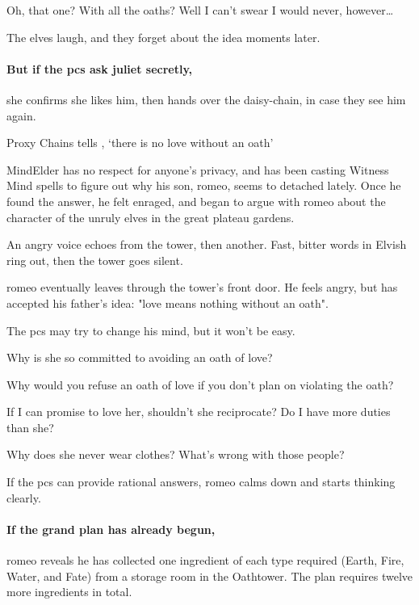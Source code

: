 \begin{speechtext}
  Oh, that one?
  With all the oaths?
  Well I can't swear I would never, however\ldots
\end{speechtext}

The elves laugh, and they forget about the idea moments later.

\paragraph{But if the \glspl{pc} ask \gls{juliet} secretly,}
she confirms she likes him, then hands over the daisy-chain, in case they see him again.

{Proxy Chains}%
{ tells , `there is no love without an oath'}%

\Gls{MindElder} has no respect for anyone's privacy, and has been casting Witness Mind spells to figure out why his son, \gls{romeo}, seems to detached lately.
Once he found the answer, he felt enraged, and began to argue with \gls{romeo} about the character of the unruly elves in the great plateau gardens.


\begin{boxtext}
  An angry voice echoes from the tower, then another.
  Fast, bitter words in Elvish ring out, then the tower goes silent.
\end{boxtext}

\Gls{romeo} eventually leaves through the tower's front door.
He feels angry, but has accepted his father's idea: "love means nothing without an oath".

The \glspl{pc} may try to change his mind, but it won't be easy.

\begin{speechtext}
  Why is she so committed to avoiding an oath of love?

  Why would you refuse an oath of love if you don't plan on violating the oath?

  If I can promise to love her, shouldn't she reciprocate?
  Do I have more duties than she?

  Why does she never wear clothes?
  What's wrong with those people?
\end{speechtext}

If the \glspl{pc} can provide rational answers, \gls{romeo} calms down and starts thinking clearly.

\paragraph{If the grand plan has already begun,}
\Gls{romeo} reveals he has collected one \gls{ingredient} of each type required (Earth, Fire, Water, and Fate) from a storage room in the Oathtower.
The plan requires twelve more \glspl{ingredient} in total.

